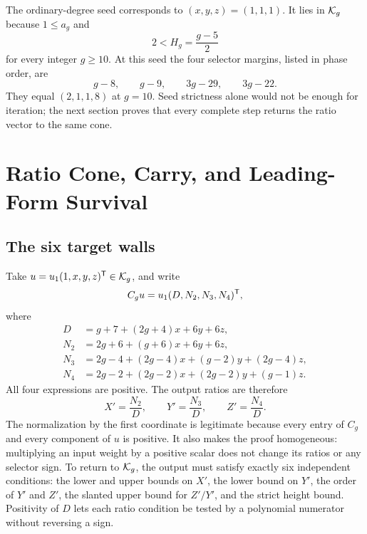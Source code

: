 \documentclass[11pt]{article}
\theoremstyle{remark}
\numberwithin{equation}{section}
\begin{document}
The ordinary-degree seed corresponds to \((x,y,z)=(1,1,1)\).  It lies in
\(\mathcal{K}_g\) because \(1\leq a_g\) and
\[
2<H_g=\frac{g-5}{2}
\]
for every integer \(g\geq10\).  At this seed the four selector margins,
listed in phase order, are
\begin{equation}\label{eq:seed-margins}
g-8,\qquad g-9,\qquad 3g-29,\qquad 3g-22.
\end{equation}
They equal \((2,1,1,8)\) at \(g=10\).  Seed strictness alone would not be
enough for iteration; the next section proves that every complete step
returns the ratio vector to the same cone.

\section{Ratio Cone, Carry, and Leading-Form Survival}\label{sec:cone}

\subsection{The six target walls}

Take \(u=u_1(1,x,y,z)^{\mathsf{T}}\in\mathcal{K}_g\), and write
\begin{equation}\label{eq:D-and-N}
C_gu=u_1(D,N_2,N_3,N_4)^{\mathsf{T}},
\end{equation}
where
\begin{equation}\label{eq:D-and-N-expanded}
\begin{aligned}
D&=g+7+(2g+4)x+6y+6z,\\
N_2&=2g+6+(g+6)x+6y+6z,\\
N_3&=2g-4+(2g-4)x+(g-2)y+(2g-4)z,\\
N_4&=2g-2+(2g-2)x+(2g-2)y+(g-1)z.
\end{aligned}
\end{equation}
All four expressions are positive.  The output ratios are therefore
\[
X'=\frac{N_2}{D},\qquad
Y'=\frac{N_3}{D},\qquad
Z'=\frac{N_4}{D}.
\]
The normalization by the first coordinate is legitimate because every
entry of \(C_g\) and every component of \(u\) is positive.  It also makes
the proof homogeneous: multiplying an input weight by a positive scalar
does not change its ratios or any selector sign.  To return to
\(\mathcal{K}_g\), the output must satisfy exactly six independent conditions:
the lower and upper bounds on \(X'\), the lower bound on \(Y'\), the order
of \(Y'\) and \(Z'\), the slanted upper bound for \(Z'/Y'\), and the strict
height bound.  Positivity of \(D\) lets each ratio condition be tested by a
polynomial numerator without reversing a sign.
\end{document}
